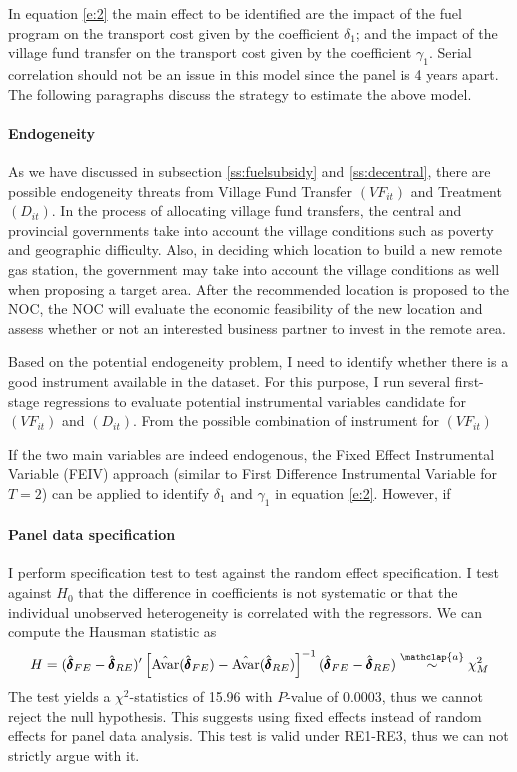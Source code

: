 \documentclass[letterpaper,12pt,leqno]{article}
\newcommand\asym{\stackrel{\mathclap{a}}{\sim}}
\newcommand{\Av}{\text{Avar}}
\begin{document}
In equation \eqref{e:2} the main effect to be identified are the impact of the fuel program on the transport cost given by the coefficient $\delta_1$; and the impact of the village fund transfer on the transport cost given by the coefficient $\gamma_1$. Serial correlation should not be an issue in this model since the panel is 4 years apart. The following paragraphs discuss the strategy to estimate the above model.

\paragraph{Endogeneity} As we have discussed in subsection \ref{ss:fuelsubsidy} and \ref{ss:decentral}, there are possible endogeneity threats from Village Fund Transfer $(VF_{it})$ and Treatment $(D_{it})$. In the process of allocating village fund transfers, the central and provincial governments take into account the village conditions such as poverty and geographic difficulty. Also, in deciding which location to build a new remote gas station, the government may take into account the village conditions as well when proposing a target area. After the recommended location is proposed to the NOC, the NOC will evaluate the economic feasibility of the new location and assess whether or not an interested business partner to invest in the remote area. 

Based on the potential endogeneity problem, I need to identify whether there is a good instrument available in the dataset. For this purpose, I run several first-stage regressions to evaluate potential instrumental variables candidate for $(VF_{it})$ and $(D_{it})$. From the possible combination of instrument for $(VF_{it})$


If the two main variables are indeed endogenous, the Fixed Effect Instrumental Variable (FEIV) approach (similar to First Difference Instrumental Variable for $T=2$) can be applied to identify $\delta_1$ and $\gamma_1$ in equation \eqref{e:2}. However, if 

\paragraph{Panel data specification} I perform \citet{hausman78} specification test to test against the random effect specification. I test against $H_0$ that the difference in coefficients is not systematic or that the individual unobserved heterogeneity is correlated with the regressors. We can compute the Hausman statistic as \begin{equation*}
        H=(\hat{\pmb{\delta}}_{FE}-\hat{\pmb{\delta}}_{RE})'\left[\hat{\Av}(\hat{\pmb{\delta}}_{FE})-\hat{\Av}(\hat{\pmb{\delta}}_{RE})\right]^{-1}(\hat{\pmb{\delta}}_{FE}-\hat{\pmb{\delta}}_{RE}) \asym \chi_M^2 \end{equation*}
The test yields a $\chi^2$-statistics of 15.96 with $P$-value of 0.0003, thus we cannot reject the null hypothesis. This suggests using fixed effects instead of random effects for panel data analysis. This test is valid under RE1-RE3, thus we can not strictly argue with it.
\end{document}
